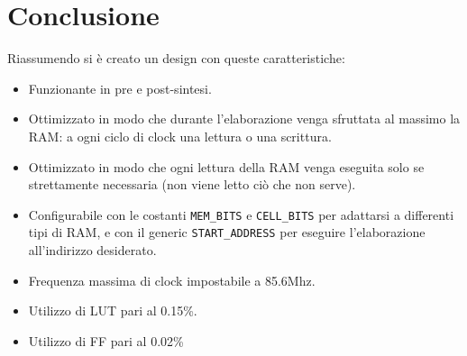 \documentclass{article}
\begin{document}
\section{Conclusione}
Riassumendo si è creato un design con queste caratteristiche:
\begin{itemize}
    \item Funzionante in pre e post-sintesi.
    \item Ottimizzato in modo che durante l'elaborazione venga sfruttata al massimo la RAM: a ogni ciclo di clock una lettura o una scrittura.
    \item Ottimizzato in modo che ogni lettura della RAM venga eseguita solo se strettamente necessaria (non viene letto ciò che non serve).
    \item Configurabile con le costanti \verb^MEM_BITS^ e \verb^CELL_BITS^ per adattarsi a differenti tipi di RAM, e con il generic \verb^START_ADDRESS^ per eseguire l'elaborazione all'indirizzo desiderato.
    \item Frequenza massima di clock impostabile a 85.6Mhz.
    \item Utilizzo di LUT pari al 0.15\%.
    \item Utilizzo di FF pari al 0.02\%
\end{itemize}
\end{document}
